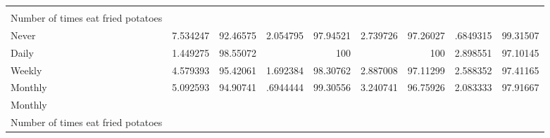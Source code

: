 \documentclass{article}
\begin{document}
\begin{table}[!h]
{\begin{tabular}{lllllllll}
				\multicolumn{1}{r}{} \\
				\multicolumn{1}{l}{\hspace{4em}Number of times eat fried potatoes} &
				\multicolumn{1}{|r}{} &
				\multicolumn{1}{r}{} &
				\multicolumn{1}{r}{} &
				\multicolumn{1}{r}{} &
				\multicolumn{1}{r}{} &
				\multicolumn{1}{r}{} &
				\multicolumn{1}{r}{} &
				\multicolumn{1}{r}{} \\
				\multicolumn{1}{l}{\hspace{5em}Never} &
				\multicolumn{1}{|r}{7.534247} &
				\multicolumn{1}{r}{92.46575} &
				\multicolumn{1}{r}{2.054795} &
				\multicolumn{1}{r}{97.94521} &
				\multicolumn{1}{r}{2.739726} &
				\multicolumn{1}{r}{97.26027} &
				\multicolumn{1}{r}{.6849315} &
				\multicolumn{1}{r}{99.31507} \\
				\multicolumn{1}{l}{\hspace{5em}Daily} &
				\multicolumn{1}{|r}{1.449275} &
				\multicolumn{1}{r}{98.55072} &
				\multicolumn{1}{r}{} &
				\multicolumn{1}{r}{100} &
				\multicolumn{1}{r}{} &
				\multicolumn{1}{r}{100} &
				\multicolumn{1}{r}{2.898551} &
				\multicolumn{1}{r}{97.10145} \\
				\multicolumn{1}{l}{\hspace{5em}Weekly} &
				\multicolumn{1}{|r}{4.579393} &
				\multicolumn{1}{r}{95.42061} &
				\multicolumn{1}{r}{1.692384} &
				\multicolumn{1}{r}{98.30762} &
				\multicolumn{1}{r}{2.887008} &
				\multicolumn{1}{r}{97.11299} &
				\multicolumn{1}{r}{2.588352} &
				\multicolumn{1}{r}{97.41165} \\
				\multicolumn{1}{l}{\hspace{5em}Monthly} &
				\multicolumn{1}{|r}{5.092593} &
				\multicolumn{1}{r}{94.90741} &
				\multicolumn{1}{r}{.6944444} &
				\multicolumn{1}{r}{99.30556} &
				\multicolumn{1}{r}{3.240741} &
				\multicolumn{1}{r}{96.75926} &
				\multicolumn{1}{r}{2.083333} &
				\multicolumn{1}{r}{97.91667} \\
				\multicolumn{1}{l}{\hspace{3em}Monthly} &
				\multicolumn{1}{|r}{} &
				\multicolumn{1}{r}{} &
				\multicolumn{1}{r}{} &
				\multicolumn{1}{r}{} &
				\multicolumn{1}{r}{} &
				\multicolumn{1}{r}{} &
				\multicolumn{1}{r}{} &
				\multicolumn{1}{r}{} \\
				\multicolumn{1}{l}{\hspace{4em}Number of times eat fried potatoes} &
				\multicolumn{1}{|r}{} &
				\multicolumn{1}{r}{} &
				\multicolumn{1}{r}{} &
				\multicolumn{1}{r}{} &

\end{tabular}}
\end{table}
\end{document}
